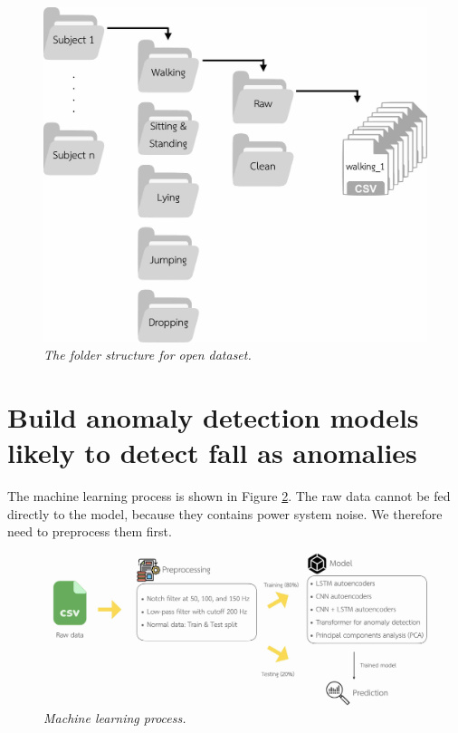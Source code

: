 \begin{figure}[H]
  \centering
  \caption[The folder structure for open dataset.]{\emph{The folder structure for open dataset.}} \label{fig:folder}
  \includegraphics[scale = 0.15]{figures/data_architecture.jpg}
\end{figure}

\section{Build anomaly detection models likely to detect fall as anomalies}

The machine learning process is shown in Figure \ref{fig:work-flow}. The raw data cannot be fed directly to the model, because they contains power system noise. We therefore need to preprocess them first.

\begin{figure}[H]
  \centering
  \caption[Machine learning process.]{\emph{Machine learning process.}} \label{fig:work-flow}
  \includegraphics[scale = 0.13]{figures/work-flow.jpg}
\end{figure}


